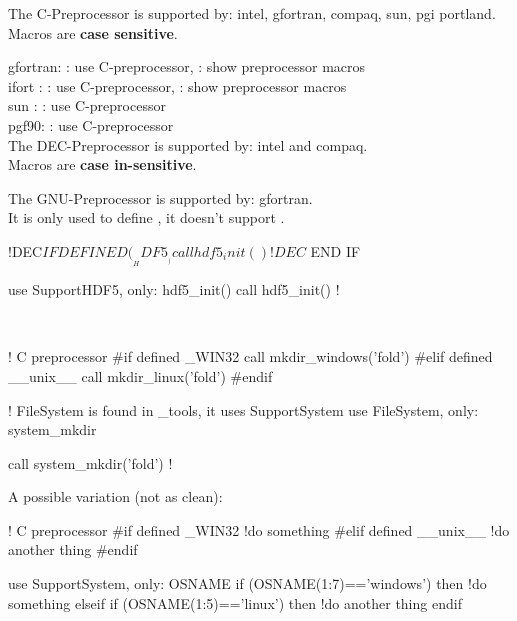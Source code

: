 \documentclass{article}
\begin{document}
The C-Preprocessor is supported by: intel, gfortran, compaq, sun, pgi portland.\\
Macros are \textbf{case sensitive}.

gfortran: 
: use C-preprocessor,
: show preprocessor macros\\
ifort :
: use C-preprocessor,
: show preprocessor macros\\
sun :
: use C-preprocessor\\
pgf90:
 : use C-preprocessor\\
%
The DEC-Preprocessor is supported by: intel and compaq.\\
Macros are \textbf{case in-sensitive}.

The GNU-Preprocessor is supported by: gfortran.\\
It is only used to define , it doesn't support .\\



\begin{codea}
!DEC$ IF DEFINED(__HDF5__)
   call hdf5_init()
!DEC$ END IF
\end{codea}
\begin{codeb}
use SupportHDF5, only: hdf5_init()
call hdf5_init()
!
\end{codeb}\\
\begin{codea}
! C preprocessor
#if defined _WIN32
  call mkdir_windows('fold')
#elif defined __unix__
  call mkdir_linux('fold')
#endif
\end{codea}
\begin{codeb}
! FileSystem is found in _tools, it uses SupportSystem
use FileSystem, only: system_mkdir 

call system_mkdir('fold')
!
\end{codeb}
A possible variation (not as clean):\\
\begin{codea}
! C preprocessor
#if defined _WIN32
  !do something
#elif defined __unix__
  !do another thing
#endif
\end{codea}
\begin{codeb}
use SupportSystem, only: OSNAME
if (OSNAME(1:7)=='windows') then
    !do something
elseif if (OSNAME(1:5)=='linux') then
    !do another thing
endif
\end{codeb}
\end{document}
